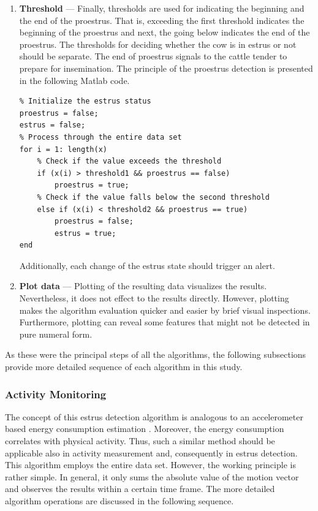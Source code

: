 \documentclass[english,12pt,a4paper,pdftex,elec,utf8]{aaltothesis}
\begin{document}
\begin{enumerate}
\item \textbf{Threshold} --- Finally, thresholds are used for indicating the beginning and the end of the proestrus. That is, exceeding the first threshold indicates the beginning of the proestrus and next, the going below indicates the end of the proestrus. The thresholds for deciding whether the cow is in estrus or not should be separate. The end of proestrus signals to the cattle tender to prepare for insemination. The principle of the proestrus detection is presented in the following Matlab code.  


\begin{lstlisting}
% Initialize the estrus status
proestrus = false;
estrus = false;
% Process through the entire data set
for i = 1: length(x)
	% Check if the value exceeds the threshold
	if (x(i) > threshold1 && proestrus == false)	
		proestrus = true;
	% Check if the value falls below the second threshold
	else if (x(i) < threshold2 && proestrus == true)
 		proestrus = false;
 		estrus = true;
end
\end{lstlisting}
Additionally, each change of the estrus state should trigger an alert.

\item \textbf{Plot data} --- Plotting of the resulting data visualizes the results. Nevertheless, it does not effect to the results directly. However, plotting makes the algorithm evaluation quicker and easier by brief visual inspections. Furthermore, plotting can reveal some features that might not be detected in pure numeral form.

\end{enumerate}
As these were the principal steps of all the algorithms, the following subsections provide more detailed sequence of each algorithm in this study.

\subsubsection{Activity Monitoring} \label{activitymeasurementsection}

The concept of this estrus detection algorithm is analogous to an accelerometer based energy consumption estimation \cite{Kang2012}. Moreover, the energy consumption correlates with physical activity. Thus, such a similar method should be applicable also in activity measurement and, consequently in estrus detection. This algorithm employs the entire data set. However, the working principle is rather simple. In general, it only sums the absolute value of the motion vector and observes the results within a certain time frame. The more detailed algorithm operations are discussed in the following sequence.
\end{document}
